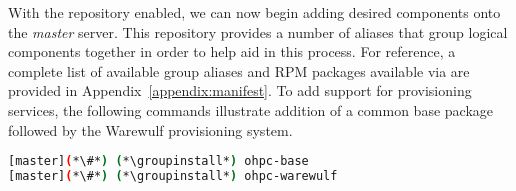 With the \OHPC{} repository enabled, we can now begin adding desired components onto the
{\em master} server. This repository provides a number of aliases that group
logical components together in order to help aid in this process. For
reference, a complete list of available group aliases and RPM packages available
via \OHPC{} are provided in Appendix~\ref{appendix:manifest}.  To add
support for provisioning services, the following commands illustrate addition
of a common base package followed by the Warewulf provisioning system.

\begin{lstlisting}[language=bash,keywords={}]
[master](*\#*) (*\groupinstall*) ohpc-base
[master](*\#*) (*\groupinstall*) ohpc-warewulf
\end{lstlisting}

